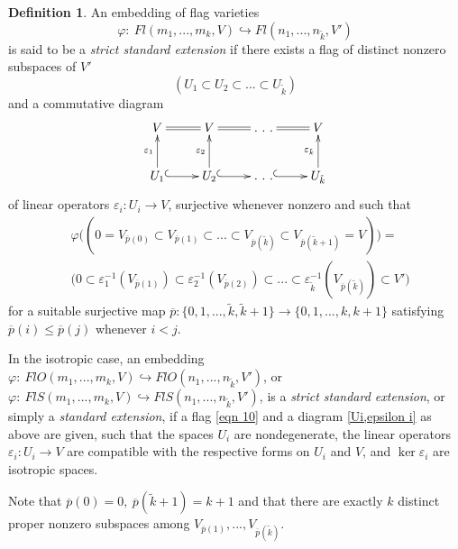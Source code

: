 \documentclass[12pt]{amsart}
\theoremstyle{definition}
\newtheorem{definition}[theorem]{Definition}
\begin{document}
\begin{definition}\label{str st ext flags}
An embedding of flag varieties 
$$
\varphi:\ Fl(m_1,...,m_k,V)\hookrightarrow Fl(n_1,...,n_{\tilde{k}},V')
$$
is said to be a \textit{strict standard extension}
if there exists a flag of distinct nonzero subspaces of 
$V'$
\begin{equation}\label{eqn 10}
(U_1\subset U_2\subset...\subset U_{\tilde{k}})
\end{equation}
and a commutative diagram
\begin{equation}\label{Ui,epsilon i}
\xymatrix{
V \ar@{=}[r]& V \ar@{=}[r]& .\ .\ . \ar@{=}[r]& V\\
U_1\ar[u]^-{\varepsilon_1} \ar@{^{(}->}[r] & 
U_2\ar[u]^-{\varepsilon_2} \ar@{^{(}->}[r] & .\ .\ . \ar@{^{(}->}[r] & 
U_{\tilde{k}} \ar[u]^-{\varepsilon_{\tilde{k}}} } 
\end{equation}
of linear operators $\varepsilon_i:U_i\to V$,
surjective whenever nonzero
and such that
\begin{equation}\label{phi(...)}
\begin{split}
& \varphi\Big((0=V_{\overline{p}(0)}\subset 
V_{\overline{p}(1)}\subset...\subset V_{\overline{p}(\tilde{k})
}\subset V_{\overline{p}(\tilde{k}+1)}=V)\Big)=\\
& \big(0\subset\varepsilon_1^{-1}(V_{\overline{p}(1)})\subset\varepsilon_2^{-1}
(V_{\overline{p}(2)})\subset...\subset
\varepsilon_{\tilde{k}}^{-1}(V_{\overline{p}(\tilde{k})})
\subset V')
\end{split}
\end{equation} 
for a suitable surjective map $\overline{p}:\{0,1,...,\tilde{k}
,\tilde{k}+1\}\to\{0,1,...,k,k+1\}$ satisfying $\overline{p}(i)
\le \overline{p}(j)$ whenever $i<j$. 

In the isotropic case, an embedding $\varphi:\ FlO(m_1,...,m_k,V)
\hookrightarrow FlO(n_1,...,n_{\tilde{k}},V')$, 
or $\varphi:\ FlS(m_1,...,m_k,V)
\hookrightarrow FlS(n_1,...,n_{\tilde{k}},V')$,
is a \textit{strict standard extension},
or simply a \textit{standard extension}, if a flag \eqref{eqn 10} and
a diagram \eqref{Ui,epsilon i} as above are given, such that the 
spaces $U_i$ are nondegenerate, the linear operators 
$\varepsilon_i:U_i\to V$ are compatible with the respective forms on 
$U_i$ and $V$, and $\ker\varepsilon_i$ are isotropic spaces. 


\vspace{3mm}
Note that $\overline{p}(0)=0,\ \overline{p}(\tilde{k}+1)=k+1$ 
and that there are exactly $k$ distinct proper nonzero 
subspaces among $V_{\overline{p}(1)},...,V_{\overline{p}
(\tilde{k})}$. 


\end{definition}
\end{document}
